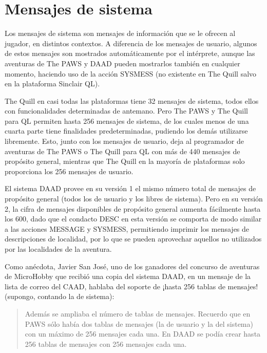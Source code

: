 \documentclass[11pt, a5paper]{article}
\newcommand{\quill}{\textsf{The Quill}\xspace}
\newcommand{\paw}{\textsf{The PAWS}\xspace}
\newcommand{\daad}{\textsf{DAAD}\xspace}
\begin{document}
\section{Mensajes de sistema}

Los mensajes de sistema son mensajes de información que se le ofrecen al jugador, en distintos contextos. A diferencia de los mensajes de usuario, algunos de estos mensajes son mostrados automáticamente por el intérprete, aunque las aventuras de \paw y \daad pueden mostrarlos también en cualquier momento, haciendo uso de la acción SYSMESS (no existente en \quill salvo en la plataforma Sinclair QL\cite[pág. 5]{QuillAWRef}).

\quill en casi todas las plataformas tiene 32 mensajes de sistema, todos ellos con funcionalidades determinadas de antemano. Pero \paw y \quill para QL permiten hasta 256 mensajes de sistema, de los cuales menos de una cuarta parte tiene finalidades predeterminadas, pudiendo los demás utilizarse libremente. Esto, junto con los mensajes de usuario, deja al programador de aventuras de \paw o \quill para QL con más de 440 mensajes de propósito general, mientras que \quill en la mayoría de plataformas solo proporciona los 256 mensajes de usuario.

El sistema \daad provee en su versión 1 el mismo número total de mensajes de propósito general (todos los de usuario y los libres de sistema). Pero en su versión 2, la cifra de mensajes disponibles de propósito general aumenta fácilmente hasta los 600, dado que el condacto DESC en esta versión se comporta de modo similar a las acciones MESSAGE y SYSMESS, permitiendo imprimir los mensajes de descripciones de localidad, por lo que se pueden aprovechar aquellos no utilizados por las localidades de la aventura.

Como anécdota, Javier San José, uno de los ganadores del concurso de aventuras de MicroHobby que recibió una copia del sistema DAAD, en un mensaje \cite{JSJ} de la lista de correo del CAAD, hablaba del soporte de ¡hasta 256 tablas de mensajes! (supongo, contando la de sistema):

\begin{quote}
\guillemotleft Además se ampliaba el número de tablas de mensajes. Recuerdo que en PAWS sólo había dos tablas de mensajes (la de usuario y la del sistema) con un máximo de 256 mensajes cada una. En \daad se podía crear hasta 256 tablas de mensajes con 256 mensajes cada una.\guillemotright
\end{quote}
\end{document}
